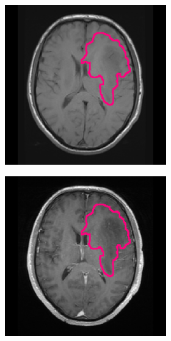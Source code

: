 \begin{subappendices}
\begin{figure}[htbp]
\begin{subfigure}[b]{0.95\textwidth}
\begin{subfigure}[b]{0.215\textwidth}
        \includegraphics[width=\textwidth, clip, trim=2.5cm 0.5cm 2.5cm 0.5cm]{Figures/Random_segs/T1_TCGA-HT-8106.png}
        \end{subfigure}
        \hfill
        \begin{subfigure}[b]{0.215\textwidth}
        \includegraphics[width=\textwidth, clip, trim=2.5cm 0.5cm 2.5cm 0.5cm]{Figures/Random_segs/T1GD_TCGA-HT-8106.png}

\end{subfigure}
\end{subfigure}
\end{figure}
\end{subappendices}
